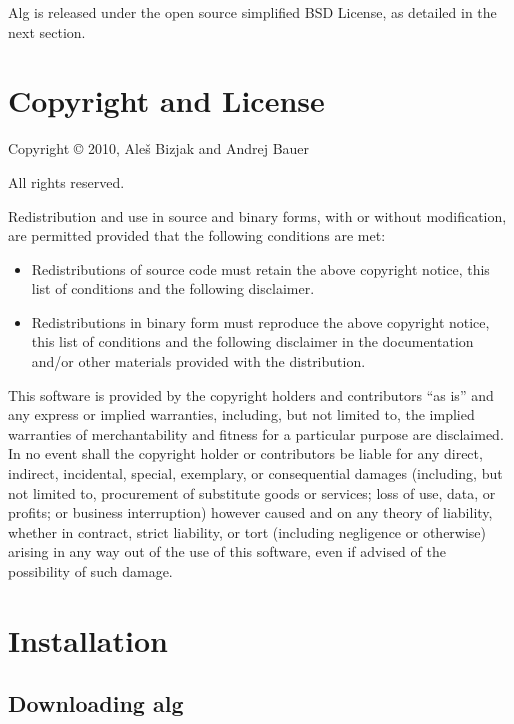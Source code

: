 \documentclass{report}
\begin{document}
Alg is released under the open source simplified BSD License, as
detailed in the next section.

\chapter{Copyright and License}
\label{cha:copyr-license}

\noindent
Copyright {\copyright} 2010, Ale\v{s} Bizjak and Andrej Bauer

\bigskip

\noindent
All rights reserved.

\bigskip

\noindent
Redistribution and use in source and binary forms, with or without
modification, are permitted provided that the following conditions are
met:
%
\begin{itemize}
\item Redistributions of source code must retain the above copyright
  notice, this list of conditions and the following disclaimer.
\item Redistributions in binary form must reproduce the above
  copyright notice, this list of conditions and the following
  disclaimer in the documentation and/or other materials provided with
  the distribution.
\end{itemize}

This software is provided by the copyright holders and contributors
``as is'' and any express or implied warranties, including, but not
limited to, the implied warranties of merchantability and fitness for
a particular purpose are disclaimed. In no event shall the copyright
holder or contributors be liable for any direct, indirect, incidental,
special, exemplary, or consequential damages (including, but not
limited to, procurement of substitute goods or services; loss of use,
data, or profits; or business interruption) however caused and on any
theory of liability, whether in contract, strict liability, or tort
(including negligence or otherwise) arising in any way out of the use
of this software, even if advised of the possibility of such damage.

\chapter{Installation}
\label{sec:installation}

\section{Downloading alg}
\label{sec:how-obtain-alg}
\end{document}
